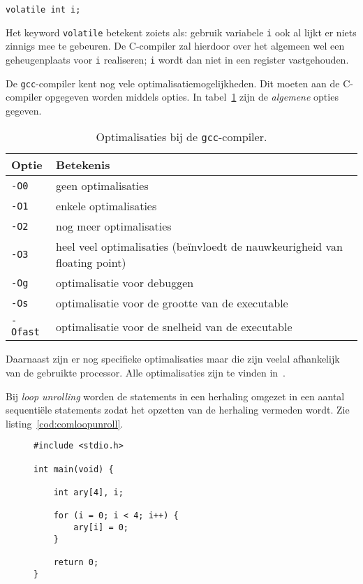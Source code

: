 \begin{lstlisting}[style=lstoneline]
volatile int i;
\end{lstlisting}

Het keyword \texttt{volatile} betekent zoiets als: gebruik variabele \texttt{i} ook al lijkt er niets zinnigs mee te gebeuren. De C-compiler zal hierdoor over het algemeen wel een geheugenplaats voor \texttt{i} realiseren; \texttt{i} wordt dan niet in een register vastgehouden.

De \texttt{gcc}-compiler kent nog vele optimalisatiemogelijkheden. Dit moeten aan de C-compiler opgegeven worden middels opties. In tabel~\ref{tab:comoptimalisaties} zijn de \textsl{algemene} opties gegeven.

\begin{table}[!ht]
\centering
\caption{Optimalisaties bij de \texttt{gcc}-compiler.}
\label{tab:comoptimalisaties}
\begin{tabular}{ll}
Optie & Betekenis \\
\midrule
\texttt{-O0} & geen optimalisaties \\
\texttt{-O1} & enkele optimalisaties \\
\texttt{-O2} & nog meer optimalisaties \\
\texttt{-O3} & heel veel optimalisaties (beïnvloedt de nauwkeurigheid van floating point)\\
\texttt{-Og} & optimalisatie voor debuggen \\
\texttt{-Os} & optimalisatie voor de grootte van de executable \\
\texttt{-Ofast} & optimalisatie voor de snelheid van de executable \\
\end{tabular}
\end{table}

Daarnaast zijn er nog specifieke optimalisaties maar die zijn veelal afhankelijk van de gebruikte processor. Alle optimalisaties zijn te vinden in~\cite{gnugcc2}.

Bij \textsl{loop unrolling} worden de statements in een herhaling omgezet in een aantal sequentiële statements zodat het opzetten van de herhaling vermeden wordt. Zie listing~\ref{cod:comloopunroll}.

\begin{figure}[!ht]
\begin{lstlisting}[caption=Een C-programma.,label=cod:comloopunroll]
#include <stdio.h>

int main(void) {

    int ary[4], i;
    
    for (i = 0; i < 4; i++) {
        ary[i] = 0;
    }
    
    return 0;
}
\end{lstlisting}
\end{figure}

